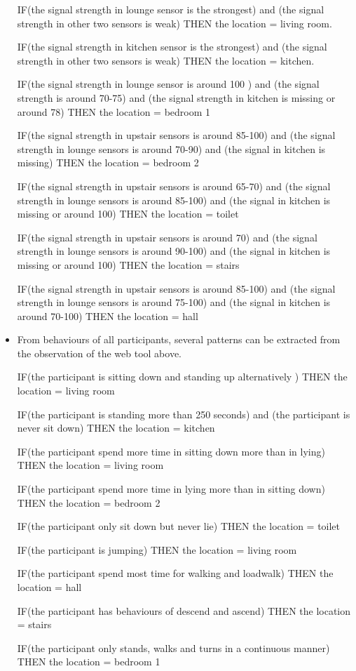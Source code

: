 \documentclass[fleqn,10pt]{SelfArx} %
\begin{document}
\begin{itemize}
IF(the signal strength in lounge sensor is the strongest) and (the signal strength in other two sensors is weak) THEN the location = living room.

IF(the signal strength in kitchen sensor is the strongest) and (the signal strength in other two sensors is weak) THEN the location = kitchen.

IF(the signal strength in lounge sensor is around 100 ) and (the signal strength is around 70-75) and (the signal strength in kitchen is missing or around 78) THEN the location = bedroom 1

IF(the signal strength in upstair sensors is around 85-100) and (the signal strength in lounge sensors is around 70-90) and (the signal in kitchen is missing) THEN the location = bedroom 2

IF(the signal strength in upstair sensors is around 65-70) and (the signal strength in lounge sensors is around 85-100) and (the signal in kitchen is missing or around 100) THEN the location = toilet

IF(the signal strength in upstair sensors is around 70) and (the signal strength in lounge sensors is around 90-100) and (the signal in kitchen is missing or around 100) THEN the location = stairs

IF(the signal strength in upstair sensors is around 85-100) and (the signal strength in lounge sensors is around 75-100) and (the signal in kitchen is around 70-100) THEN the location = hall
\item From behaviours of all participants, several patterns can be extracted from the observation of the web tool above.

IF(the participant is sitting down and standing up alternatively ) THEN the location = living room

IF(the participant is standing more than 250 seconds) and (the participant is never sit down) THEN the location = kitchen

IF(the participant spend more time in sitting down more than in lying) THEN the location = living room

IF(the participant spend more time in lying more than in sitting down) THEN the location = bedroom 2

IF(the participant only sit down but never lie) THEN the location = toilet

IF(the participant is jumping) THEN the location = living room

IF(the participant spend most time for walking and loadwalk) THEN the location = hall

IF(the participant has behaviours of descend and ascend) THEN the location = stairs

IF(the participant only stands, walks and turns in a continuous manner) THEN the location = bedroom 1
\end{itemize}
\end{document}
